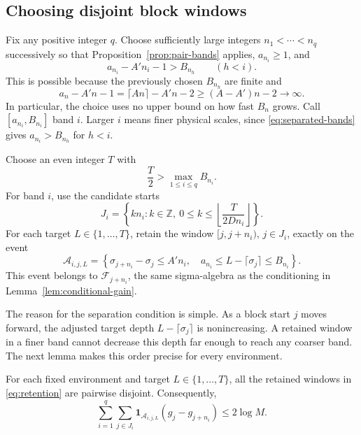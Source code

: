 \subsection{Choosing disjoint block windows}

Fix any positive integer $q$.  Choose sufficiently large integers
$n_1<\cdots<n_q$ successively so that
Proposition~\ref{prop:pair-bands} applies, $a_{n_i}\ge1$, and
\begin{equation}\label{eq:separated-bands}
 a_{n_i}-A'n_i-1>B_{n_h}\qquad(h<i).
\end{equation}
This is possible because the previously chosen $B_{n_h}$ are finite and
\[
 a_n-A'n-1=\lceil An\rceil-A'n-2
 \ge(A-A')n-2\longrightarrow\infty.
\]
In particular, the choice uses no upper bound on how fast $B_n$ grows.
Call $[a_{n_i},B_{n_i}]$ band $i$.  Larger $i$ means finer physical
scales, since \eqref{eq:separated-bands} gives $a_{n_i}>B_{n_h}$ for $h<i$.

Choose an even integer $T$ with
\begin{equation}\label{eq:target-range}
 \frac T2>\max_{1\le i\le q}B_{n_i}.
\end{equation}
For band $i$, use the candidate starts
\begin{equation}\label{eq:candidate-starts}
 J_i=\left\{kn_i:k\in\mathbb Z,\ 0\le k\le
                  \left\lfloor\frac{T}{2Dn_i}\right\rfloor\right\}.
\end{equation}
For each target $L\in\{1,\ldots,T\}$, retain the window
$[j,j+n_i)$, $j\in J_i$, exactly on the event
\begin{equation}\label{eq:retention}
 \mathcal A_{i,j,L}=
 \left\{\sigma_{j+n_i}-\sigma_j\le A'n_i,\quad
 a_{n_i}\le L-\lceil\sigma_j\rceil\le B_{n_i}\right\}.
\end{equation}
This event belongs to $\mathcal F_{j+n_i}$, the same sigma-algebra as
the conditioning in Lemma~\ref{lem:conditional-gain}.

The reason for the separation condition is simple.  As a block start
$j$ moves forward, the adjusted target depth
$L-\lceil\sigma_j\rceil$ is nonincreasing.  A retained window in a finer
band cannot decrease this depth far enough to reach any coarser band.
The next lemma makes this order precise for every environment.

\begin{lemma}\label{lem:disjoint-windows}
For each fixed environment and target $L\in\{1,\ldots,T\}$, all the
retained windows in \eqref{eq:retention} are pairwise disjoint.
Consequently,
\begin{equation}\label{eq:telescoping-windows}
 \sum_{i=1}^q\sum_{j\in J_i}
 \mathbf1_{\mathcal A_{i,j,L}}(g_j-g_{j+n_i})
 \le2\log M.
\end{equation}
\end{lemma}

